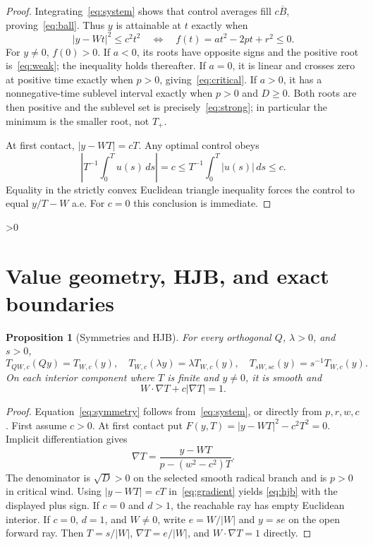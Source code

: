\documentclass[10pt]{article}
\providecommand{\CRevisionRound}{2}
\newtheorem{proposition}{Proposition}
\newcommand{\B}{\overline B}
\begin{document}
\begin{proof}
Integrating~\eqref{eq:system} shows that control averages fill
$c\B$, proving~\eqref{eq:ball}. Thus $y$ is attainable at $t$ exactly when
\begin{equation}\label{eq:quadratic}
 |y-Wt|^2\le c^2t^2
 \quad\Longleftrightarrow\quad
 f(t)=at^2-2pt+r^2\le0.
\end{equation}
For $y\ne0$, $f(0)>0$. If $a<0$, its roots have opposite signs and the
positive root is~\eqref{eq:weak}; the inequality holds thereafter. If
$a=0$, it is linear and crosses zero at positive time exactly when $p>0$,
giving~\eqref{eq:critical}. If $a>0$, it has a nonnegative-time sublevel
interval exactly when $p>0$ and $D\ge0$. Both roots are then positive and
the sublevel set is precisely~\eqref{eq:strong}; in particular the minimum
is the smaller root, not $T_+$.

At first contact, $|y-WT|=cT$. Any optimal control obeys
\[
 \left|T^{-1}\int_0^T u(s)\,ds\right|=c
 \le T^{-1}\int_0^T|u(s)|\,ds\le c.
\]
Equality in the strictly convex Euclidean triangle inequality forces the
control to equal $y/T-W$ a.e. For $c=0$ this conclusion is immediate.
\end{proof}

\ifnum\CRevisionRound>0
\section{Value geometry, HJB, and exact boundaries}
\begin{proposition}[Symmetries and HJB]\label{prop:hjb}
For every orthogonal $Q$, $\lambda>0$, and $s>0$,
\begin{equation}\label{eq:symmetry}
 T_{QW,c}(Qy)=T_{W,c}(y),\quad
 T_{W,c}(\lambda y)=\lambda T_{W,c}(y),\quad
 T_{sW,sc}(y)=s^{-1}T_{W,c}(y).
\end{equation}
On each interior component where $T$ is finite and $y\ne0$, it is smooth and
\begin{equation}\label{eq:hjb}
 W\cdot\nabla T+c|\nabla T|=1.
\end{equation}
\end{proposition}
\begin{proof}
Equation~\eqref{eq:symmetry} follows from~\eqref{eq:system}, or directly from
$p,r,w,c$. First assume $c>0$. At first contact put
$F(y,T)=|y-WT|^2-c^2T^2=0$. Implicit differentiation gives
\begin{equation}\label{eq:gradient}
 \nabla T=\frac{y-WT}{p-(w^2-c^2)T}.
\end{equation}
The denominator is $\sqrt D>0$ on the selected smooth radical branch and is
$p>0$ in critical wind. Using $|y-WT|=cT$ in~\eqref{eq:gradient} yields
\eqref{eq:hjb} with the displayed plus sign. If $c=0$ and $d>1$, the
reachable ray has empty Euclidean interior. If $c=0$, $d=1$, and $W\ne0$,
write $e=W/|W|$ and $y=se$ on the open forward ray. Then
$T=s/|W|$, $\nabla T=e/|W|$, and $W\cdot\nabla T=1$ directly.
\end{proof}
\end{document}
